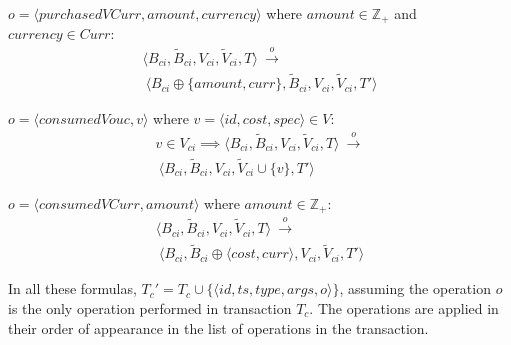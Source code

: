 \begin{enumerate}
	$o = \langle purchasedVCurr, amount, currency \rangle$ where $amount \in \mathbb{Z}_{+}$ and $currency \in Curr$:
	\begin{multline} \label{eq:purchaseCurr_virtual_wallet}
	    \langle B_{ci}, \widetilde{B}_{ci}, V_{ci}, \widetilde{V}_{ci}, T \rangle ~ \overset{o}{\rightarrow} \\
	    ~ \langle B_{ci} \oplus \{amount, curr\}, \widetilde{B}_{ci}, V_{ci}, \widetilde{V}_{ci}, T' \rangle
	\end{multline}
	
	$o = \langle consumedVouc, v \rangle$ where $v=\langle id, cost, spec \rangle  \in V$:
	\begin{multline} \label{eq:consumeVouc_virtual_wallet}
		 v \in V_{ci} \implies 
	    \langle B_{ci}, \widetilde{B}_{ci}, V_{ci}, \widetilde{V}_{ci}, T \rangle ~ \overset{o}{\rightarrow} \\
	     ~ \langle B_{ci}, \widetilde{B}_{ci}, V_{ci}, \widetilde{V}_{ci} \cup \{v\}, T' \rangle 	
	\end{multline}
	
	$o = \langle consumedVCurr, amount \rangle$ where $amount \in \mathbb{Z}_{+}$:
	\begin{multline} \label{eq:consumeVCurr_virtual_wallet}
	    \langle B_{ci}, \widetilde{B}_{ci}, V_{ci}, \widetilde{V}_{ci}, T \rangle ~ \overset{o}{\rightarrow} \\
	    ~ \langle B_{ci}, \widetilde{B}_{ci} \oplus \langle cost, curr \rangle, V_{ci}, \widetilde{V}_{ci}, T' \rangle 	
	\end{multline}
	
	In all these formulas, $T_{c}'=T_{c} \cup \{ \langle id, ts, type, args, o \rangle \}$, assuming the operation $o$ is the only operation performed in transaction $T_{c}$. The operations are applied in their order of appearance in the list of operations in the transaction.
\end{enumerate}